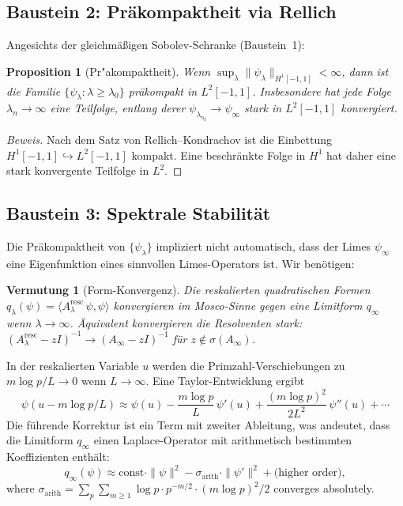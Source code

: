 \documentclass[12pt,a4paper]{article}
\newtheorem{proposition}[theorem]{Proposition}
\newtheorem{conjecture}[theorem]{Vermutung}
\theoremstyle{definition}
\theoremstyle{remark}
\begin{document}
\subsection{Baustein 2: Pr\"akompaktheit via Rellich}

Angesichts der gleichmäßigen Sobolev-Schranke (Baustein~1):

\begin{proposition}[Pr"akompaktheit]
\label{prop:precompact}
Wenn $\sup_\lambda \|\psi_\lambda\|_{H^1[-1,1]} < \infty$, dann ist die Familie $\{\psi_\lambda : \lambda \geq \lambda_0\}$ präkompakt in $L^2[-1,1]$. Insbesondere hat jede Folge $\lambda_n \to \infty$ eine Teilfolge, entlang derer $\psi_{\lambda_{n_k}} \to \psi_\infty$ stark in $L^2[-1,1]$ konvergiert.
\end{proposition}

\begin{proof}[Beweis]
Nach dem Satz von Rellich--Kondrachov ist die Einbettung $H^1[-1,1] \hookrightarrow L^2[-1,1]$ kompakt. Eine beschränkte Folge in $H^1$ hat daher eine stark konvergente Teilfolge in $L^2$.
\end{proof}

\subsection{Baustein 3: Spektrale Stabilit\"at}

Die Präkompaktheit von $\{\psi_\lambda\}$ impliziert nicht automatisch, dass der Limes $\psi_\infty$ eine Eigenfunktion eines sinnvollen Limes-Operators ist. Wir benötigen:

\begin{conjecture}[Form-Konvergenz]
\label{conj:mosco}
Die reskalierten quadratischen Formen $q_\lambda(\psi) = \langle A_\lambda^{\mathrm{resc}}\,\psi, \psi\rangle$ konvergieren im Mosco-Sinne gegen eine Limitform $q_\infty$ wenn $\lambda \to \infty$. Äquivalent konvergieren die Resolventen stark:
$(A_\lambda^{\mathrm{resc}} - zI)^{-1} \to (A_\infty - zI)^{-1}$ für $z \notin \sigma(A_\infty)$.
\end{conjecture}

In der reskalierten Variable $u$ werden die Primzahl-Verschiebungen zu $m\log p / L \to 0$ wenn $L \to \infty$. Eine Taylor-Entwicklung ergibt
\[
  \psi(u - m\log p / L) \approx \psi(u) - \frac{m\log p}{L}\,\psi'(u) + \frac{(m\log p)^2}{2L^2}\,\psi''(u) + \cdots
\]
Die führende Korrektur ist ein Term mit zweiter Ableitung, was andeutet, dass die Limitform $q_\infty$ einen Laplace-Operator mit arithmetisch bestimmten Koeffizienten enthält:
\begin{equation}
\label{eq:limit-form}
q_\infty(\psi) \approx \mathrm{const} \cdot \|\psi\|^2 - \sigma_{\mathrm{arith}} \cdot \|\psi'\|^2 + \text{(higher order)},
\end{equation}
where $\sigma_{\mathrm{arith}} = \sum_p \sum_{m \geq 1} \log p \cdot p^{-m/2} \cdot (m\log p)^2 / 2$ converges absolutely.
\end{document}
